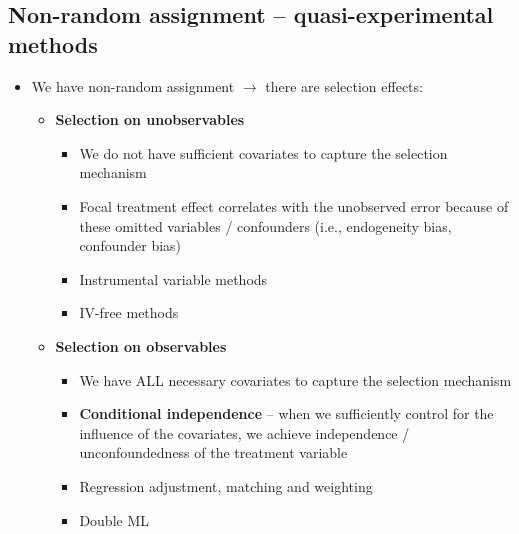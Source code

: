 \documentclass[10pt]{article}
\begin{document}
\subsection{Non-random assignment -- quasi-experimental methods}
\begin{itemize}
    \item We have non-random assignment $\to $ there are selection effects:
    \begin{itemize}
        \item \textbf{Selection on unobservables}
        \begin{itemize}
            \item We do not have sufficient covariates to capture the selection mechanism
            \item Focal treatment effect correlates with the unobserved error because of these omitted variables / confounders (i.e., endogeneity bias, confounder bias)
            \item Instrumental variable methods 
            \item IV-free methods 
        \end{itemize}
        \item \textbf{Selection on observables}
        \begin{itemize}
            \item We have ALL necessary covariates to capture the selection mechanism
            \item \textbf{Conditional independence} -- when we sufficiently control for the influence of the covariates, we achieve independence / unconfoundedness of the treatment variable
            \item Regression adjustment, matching and weighting
            \item Double ML 
        \end{itemize}
    \end{itemize}
\end{itemize}
\end{document}
